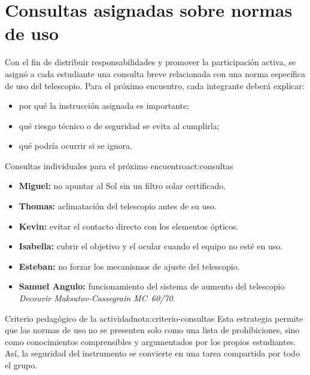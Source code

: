 \section{Consultas asignadas sobre normas de uso}

Con el fin de distribuir responsabilidades y promover la participación activa, se
asignó a cada estudiante una consulta breve relacionada con una norma específica de
uso del telescopio. Para el próximo encuentro, cada integrante deberá explicar:

\begin{itemize}[leftmargin=1.5em]
    \item por qué la instrucción asignada es importante;
    \item qué riesgo técnico o de seguridad se evita al cumplirla;
    \item qué podría ocurrir si se ignora.
\end{itemize}

\begin{actividad}{Consultas individuales para el próximo encuentro}{act:consultas}
    \begin{itemize}[leftmargin=1.5em]
        \item \textbf{Miguel:} no apuntar al Sol sin un filtro solar certificado.
        \item \textbf{Thomas:} aclimatación del telescopio antes de su uso.
        \item \textbf{Kevin:} evitar el contacto directo con los elementos ópticos.
        \item \textbf{Isabella:} cubrir el objetivo y el ocular cuando el equipo no
              esté en uso.
        \item \textbf{Esteban:} no forzar los mecanismos de ajuste del telescopio.
        \item \textbf{Samuel Angulo:} funcionamiento del sistema de aumento del
              telescopio \textit{Decouvir Maksutov-Cassegrain MC~60/70}.
    \end{itemize}
\end{actividad}

\begin{nota}{Criterio pedagógico de la actividad}{nota:criterio-consultas}
    Esta estrategia permite que las normas de uso no se presenten solo como una lista
    de prohibiciones, sino como conocimientos comprensibles y argumentados por los
    propios estudiantes. Así, la seguridad del instrumento se convierte en una tarea
    compartida por todo el grupo.
\end{nota}

